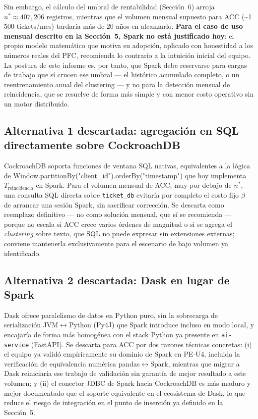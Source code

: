 \documentclass[11pt]{article}
\begin{document}
Sin embargo, el cálculo del umbral de rentabilidad (Sección~6) arroja
$n^*\approx407{,}206$ registros, mientras que el volumen mensual
supuesto para ACC (\textasciitilde1\,500 tickets/mes) tardaría más de
20 años en alcanzarlo. \textbf{Para el caso de uso mensual descrito en
la Sección~5, Spark no está justificado hoy}: el propio modelo
matemático que motiva su adopción, aplicado con honestidad a los
números reales del PFC, recomienda lo contrario a la intuición inicial
del equipo. La postura de este informe es, por tanto, que Spark debe
reservarse para cargas de trabajo que sí crucen ese umbral --- el
histórico acumulado completo, o un reentrenamiento anual del clustering
--- y no para la detección mensual de reincidencia, que se resuelve de
forma más simple y con menor costo operativo sin un motor distribuido.

\subsection{Alternativa 1 descartada: agregación en SQL directamente sobre CockroachDB}

CockroachDB soporta funciones de ventana SQL nativas, equivalentes a la
lógica de Window.partitionBy("client\_id").orderBy("timestamp")
que hoy implementa $T_{\mathrm{reincidencia}}$ en Spark. Para el volumen
mensual de ACC, muy por debajo de $n^*$, una consulta SQL directa sobre
\texttt{ticket\_db} evitaría por completo el costo fijo $\beta$ de
arrancar una sesión Spark, sin sacrificar corrección. Se descarta como
reemplazo definitivo --- no como solución mensual, que sí se recomienda
--- porque no escala si ACC crece varios órdenes de magnitud o si se
agrega el \emph{clustering} sobre texto, que SQL no puede expresar sin
extensiones externas; conviene mantenerla exclusivamente para el
escenario de bajo volumen ya identificado.

\subsection{Alternativa 2 descartada: Dask en lugar de Spark}

Dask ofrece paralelismo de datos en Python puro, sin la sobrecarga de
serialización JVM$\leftrightarrow$Python (Py4J) que Spark introduce
incluso en modo local, y encajaría de forma más homogénea con el stack
Python ya presente en \texttt{ai-service} (FastAPI). Se descarta para
ACC por dos razones técnicas concretas: (i) el equipo ya validó
empíricamente su dominio de Spark en PE-U4, incluida la verificación de
equivalencia numérica pandas$\leftrightarrow$Spark, mientras que migrar
a Dask reiniciaría ese trabajo de validación sin garantía de mejor
resultado a este volumen; y (ii) el conector JDBC de Spark hacia
CockroachDB es más maduro y mejor documentado que el soporte equivalente
en el ecosistema de Dask, lo que reduce el riesgo de integración en el
punto de inserción ya definido en la Sección~5.
\end{document}
